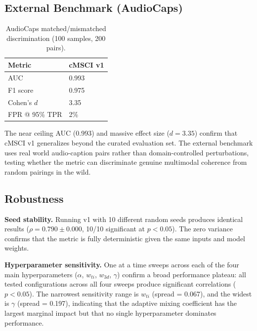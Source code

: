 \subsection{External Benchmark (AudioCaps)}\label{sec:audiocaps}

\begin{table}[t]
\caption{AudioCaps matched/mismatched discrimination (100 samples, 200 pairs).}\label{tab:audiocaps}
\centering
\begin{tabular}{ll}
\toprule
Metric & cMSCI v1 \\
\midrule
AUC & 0.993 \\
F1 score & 0.975 \\
Cohen's $d$ & 3.35 \\
FPR @ 95\% TPR & 2\% \\
\bottomrule
\end{tabular}
\end{table}

The near ceiling AUC (0.993) and massive effect size ($d = 3.35$) confirm that cMSCI v1 generalizes beyond the curated evaluation set. The external benchmark uses real world audio-caption pairs rather than domain-controlled perturbations, testing whether the metric can discriminate genuine multimodal coherence from random pairings in the wild.

\subsection{Robustness}\label{sec:robustness}

\textbf{Seed stability.} Running v1 with 10 different random seeds produces identical results ($\rho = 0.790 \pm 0.000$, 10/10 significant at $p < 0.05$). The zero variance confirms that the metric is fully deterministic given the same inputs and model weights.

\textbf{Hyperparameter sensitivity.} One at a time sweeps across each of the four main hyperparameters ($\alpha$, $w_{ti}$, $w_{3d}$, $\gamma$) confirm a broad performance plateau: all tested configurations across all four sweeps produce significant correlations ($p < 0.05$). The narrowest sensitivity range is $w_{ti}$ (spread = 0.067), and the widest is $\gamma$ (spread = 0.197), indicating that the adaptive mixing coefficient has the largest marginal impact but that no single hyperparameter dominates performance.

